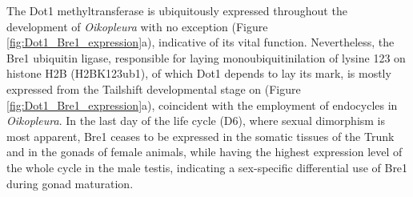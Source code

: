 \documentclass[11pt,twoside,a4paper]{report}
\begin{document}
	The Dot1 methyltransferase is ubiquitously expressed throughout the development of \textit{Oikopleura} with no exception (Figure \ref{fig:Dot1_Bre1_expression}a), indicative of its vital function. Nevertheless, the Bre1 ubiquitin ligase, responsible for laying monoubiquitinilation of lysine 123 on histone H2B (H2BK123ub1), of which Dot1 depends to lay its mark, is mostly expressed from the Tailshift developmental stage on (Figure \ref{fig:Dot1_Bre1_expression}a), coincident with the employment of endocycles in \textit{Oikopleura}. In the last day of the life cycle (D6), where sexual dimorphism is most apparent, Bre1 ceases to be expressed in the somatic tissues of the Trunk and in the gonads of female animals, while having the highest expression level of the whole cycle in the male testis, indicating a sex-specific differential use of Bre1 during gonad maturation.
	
\end{document}
